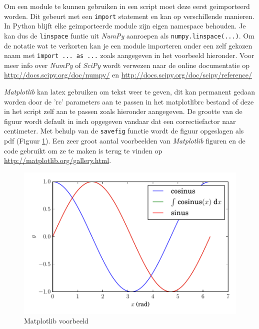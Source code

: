 \documentclass[11pt,twoside]{article}
\begin{document}
Om een module te kunnen gebruiken in een script moet deze eerst geimporteerd worden. Dit gebeurt met een \lstinline{import} statement en kan op verschillende manieren. In Python blijft elke geimporteerde module zijn eigen namespace behouden. Je kan dus de \lstinline{linspace} funtie uit \emph{NumPy} aanroepen als \lstinline{numpy.linspace(...)}. Om de notatie wat te verkorten kan je een module importeren onder een zelf gekozen naam met \lstinline{import ... as ...} zoals aangegeven in het voorbeeld hieronder. Voor meer info over \emph{NumPy} of \emph{SciPy} wordt verwezen naar de online documentatie op \url{http://docs.scipy.org/doc/numpy/} en \url{http://docs.scipy.org/doc/scipy/reference/}

\emph{Matplotlib} kan latex gebruiken om tekst weer te geven, dit kan permanent gedaan worden door de 'rc' parameters aan te passen in het \textsf{matplotlibrc} bestand of deze in het script zelf aan te passen zoals hieronder aangegeven. De grootte van de figuur wordt default in inch opgegeven vandaar dat een correctiefactor naar centimeter. Met behulp van de \lstinline{savefig} functie wordt de figuur opgeslagen als pdf (Figuur \ref{fig:sinus_cosinus}). Een zeer groot aantal voorbeelden van \emph{Matplotlib} figuren en de code gebruikt om ze te maken is terug te vinden op \url{http://matplotlib.org/gallery.html}.


\begin{figure}[ht]
	\centering
	\includegraphics[scale=0.5]{examples/sinus_cosinus}
	\caption{Matplotlib voorbeeld}
	\label{fig:sinus_cosinus}
\end{figure}
\end{document}
